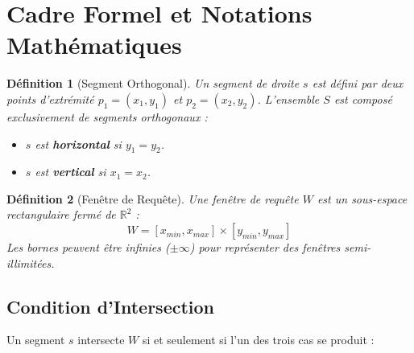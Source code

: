 \documentclass[11pt,a4paper]{article}
\newtheorem{definition}{Définition}
\begin{document}
\section{Cadre Formel et Notations Mathématiques}

\begin{definition}[Segment Orthogonal]
Un segment de droite $s$ est défini par deux points d'extrémité $p_1 = (x_1, y_1)$ et $p_2 = (x_2, y_2)$. L'ensemble $S$ est composé exclusivement de segments orthogonaux :
\begin{itemize}
    \item $s$ est \textbf{horizontal} si $y_1 = y_2$.
    \item $s$ est \textbf{vertical} si $x_1 = x_2$.
\end{itemize}
\end{definition}

\begin{definition}[Fenêtre de Requête]
Une fenêtre de requête $W$ est un sous-espace rectangulaire fermé de $\mathbb{R}^2$ :
\[ W = [x_{min}, x_{max}] \times [y_{min}, y_{max}] \]
Les bornes peuvent être infinies ($\pm\infty$) pour représenter des fenêtres semi-illimitées.
\end{definition}

\subsection{Condition d'Intersection}

Un segment $s$ intersecte $W$ si et seulement si l'un des trois cas se produit :
\end{document}
